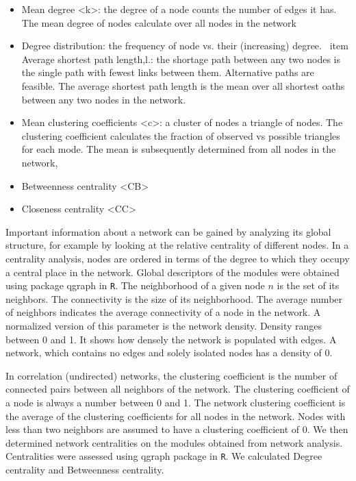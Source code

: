 \documentclass{frontiersSCNS} %
\begin{document}
\begin{itemize}
\item Mean degree <k>: the degree of a node counts the number of edges it has. The mean degree of nodes calculate over all  nodes in the network
\item Degree distribution: the frequency of node vs. their (increasing) degree.
\ item Average shortest path length,l.: the shortage path between any two nodes is the single path with fewest links between them. Alternative paths are feasible. The average shortest path length is the mean over all shortest oaths between any two nodes in the network.
\item Mean clustering coefficients <c>: a cluster of nodes  a triangle of nodes. The clustering coefficient calculates the fraction of observed vs possible triangles for each mode. The mean is subsequently determined from all nodes in the network,
\item Betweenness centrality <CB>
\item Closeness centrality <CC>
\end{itemize}

Important information about a network can be gained by analyzing its global structure, for example by looking at the relative centrality of different nodes. In a centrality analysis, nodes are ordered in terms of the degree to which they occupy a central place in the network. Global descriptors of the modules were obtained using package qgraph in \texttt{R}. The neighborhood of a given node $n$ is the set of its neighbors. The connectivity is the size of its neighborhood. The average number of neighbors indicates the average connectivity of a node in the network. A normalized version of this parameter is the network density. Density ranges between 0 and 1. It shows how densely the network is populated with edges. A network, which contains no edges and solely isolated nodes has a density of 0. 

In correlation (undirected) networks, the clustering coefficient is the number of connected pairs between all neighbors of the network. The clustering coefficient of a node is always a number between 0 and 1. The network clustering coefficient is the average of the clustering coefficients for all nodes in the network. Nodes with less than two neighbors are assumed to have a clustering coefficient of 0. We then determined network centralities on the modules obtained from network analysis. Centralities were assessed using qgraph package in \texttt{R}. We calculated Degree centrality and Betweenness centrality.
\end{document}
